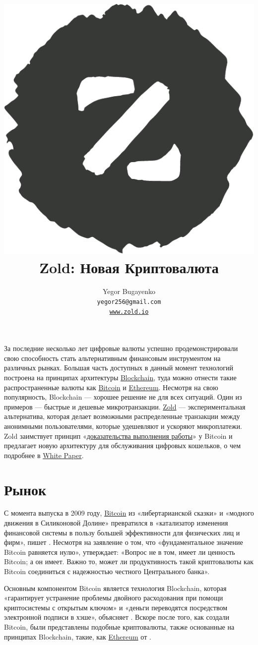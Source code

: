 \documentclass{main}
\title{\includegraphics[scale=0.3]{../images/logo.pdf}\\
  Zold: Новая Криптовалюта\\
  {\small\colorbox{dgreen}{\color{lgreen}{Green Paper}}}}
\author{Yegor Bugayenko\\
  \texttt{yegor256@gmail.com}\\
  \href{https://www.zold.io}{\texttt{www.zold.io}}\\[1em]
  \href{https://github.com/zold-io/papers/releases/tag/\zoldversion}{\texttt{\zoldversion}}}
\begin{document}
\maketitle

За последние несколько лет цифровые валюты успешно продемонстрировали свою
способность стать альтернативным финансовым инструментом на различных рынках.
Большая часть доступных в данный момент технологий построена на принципах
архитектуры \href{https://en.wikipedia.org/wiki/Blockchain}{Blockchain},
туда можно отнести такие распространенные валюты как
\href{https://bitcoin.org/}{Bit\-coin} и \href{https://ethereum.org/}{Ethe\-reum}.
Несмотря на свою популярность, Blockchain --- хорошее решение
не для всех ситуаций. Один из примеров --- быстрые и дешевые микротранзакции.
\href{https://www.zold.io}{Zold} --- экспериментальная альтернатива, которая делает возможными распределенные
транзакции между анонимными пользователями, которые удешевляют и ускоряют микроплатежи.
Zold заимствует принцип «\href{https://ru.wikipedia.org/wiki/%D0%94%D0%BE%D0%BA%D0%B0%D0%B7%D0%B0%D1%82%D0%B5%D0%BB%D1%8C%D1%81%D1%82%D0%B2%D0%BE_%D0%B2%D1%8B%D0%BF%D0%BE%D0%BB%D0%BD%D0%B5%D0%BD%D0%B8%D1%8F_%D1%80%D0%B0%D0%B1%D0%BE%D1%82%D1%8B}{доказательства выполнения работы}»
у Bitcoin и предлагает новую архитектуру для обслуживания
цифровых кошельков, о чем подробнее в \href{https://papers.zold.io}{White Paper}.

\pagebreak

\section*{Рынок}

С момента выпуска в 2009 году, \href{https://bitcoin.org/}{Bitcoin} из «либертарианской сказки»
и «модного движения в Силиконовой Долине» превратился в «катализатор изменения финансовой
системы в пользу большей эффективности для физических лиц и фирм», пишет
. Несмотря на заявление  о том, что «фундаментальное значение
Bitcoin равняется нулю»,  утверждает: «Вопрос не в том, имеет ли
ценность Bitcoin; а он имеет. Важно то, может ли продуктивность такой
криптовалюты как Bitcoin соединиться с надежностью честного Центрального банка».

Основным компонентом Bitcoin является технология Blockchain, которая
«гарантирует устранение проблемы двойного расходования при помощи криптосистемы
с открытым ключом» и «деньги переводятся посредством электронной подписи в
хэше», объясняет . Вскоре после того, как создали Bitcoin, были
представлены подобные криптовалюты, также основанные на принципах Blockchain,
такие, как \href{https://ethereum.org/}{Ethereum} от .
\end{document}

